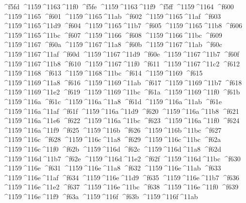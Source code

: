 \checkit ^^^^f5fd ^^^^1159^^^^1163^^^^11f0
\checkit ^^^^f5fe ^^^^1159^^^^1163^^^^11f9
\checkit ^^^^f5ff ^^^^1159^^^^1164
\checkit ^^^^f600 ^^^^1159^^^^1165
\checkit ^^^^f601 ^^^^1159^^^^1165^^^^11ab
\checkit ^^^^f602 ^^^^1159^^^^1165^^^^11af
\checkit ^^^^f603 ^^^^1159^^^^1165^^^^11d9
\checkit ^^^^f604 ^^^^1159^^^^1165^^^^11b7
\checkit ^^^^f605 ^^^^1159^^^^1165^^^^11b8
\checkit ^^^^f606 ^^^^1159^^^^1165^^^^11bc
\checkit ^^^^f607 ^^^^1159^^^^1166
\checkit ^^^^f608 ^^^^1159^^^^1166^^^^11bc
\checkit ^^^^f609 ^^^^1159^^^^1167
\checkit ^^^^f60a ^^^^1159^^^^1167^^^^11a8
\checkit ^^^^f60b ^^^^1159^^^^1167^^^^11ab
\checkit ^^^^f60c ^^^^1159^^^^1167^^^^11af
\checkit ^^^^f60d ^^^^1159^^^^1167^^^^11d9
\checkit ^^^^f60e ^^^^1159^^^^1167^^^^11b7
\checkit ^^^^f60f ^^^^1159^^^^1167^^^^11b8
\checkit ^^^^f610 ^^^^1159^^^^1167^^^^11f0
\checkit ^^^^f611 ^^^^1159^^^^1167^^^^11c2
\checkit ^^^^f612 ^^^^1159^^^^1168
\checkit ^^^^f613 ^^^^1159^^^^1168^^^^11bc
\checkit ^^^^f614 ^^^^1159^^^^1169
\checkit ^^^^f615 ^^^^1159^^^^1169^^^^11a8
\checkit ^^^^f616 ^^^^1159^^^^1169^^^^11ab
\checkit ^^^^f617 ^^^^1159^^^^1169^^^^11b7
\checkit ^^^^f618 ^^^^1159^^^^1169^^^^11e2
\checkit ^^^^f619 ^^^^1159^^^^1169^^^^11bc
\checkit ^^^^f61a ^^^^1159^^^^1169^^^^11f0
\checkit ^^^^f61b ^^^^1159^^^^116a
\checkit ^^^^f61c ^^^^1159^^^^116a^^^^11a8
\checkit ^^^^f61d ^^^^1159^^^^116a^^^^11ab
\checkit ^^^^f61e ^^^^1159^^^^116a^^^^11af
\checkit ^^^^f61f ^^^^1159^^^^116a^^^^11d9
\checkit ^^^^f620 ^^^^1159^^^^116a^^^^11b8
\checkit ^^^^f621 ^^^^1159^^^^116a^^^^11e6
\checkit ^^^^f622 ^^^^1159^^^^116a^^^^11bc
\checkit ^^^^f623 ^^^^1159^^^^116a^^^^11f0
\checkit ^^^^f624 ^^^^1159^^^^116a^^^^11f9
\checkit ^^^^f625 ^^^^1159^^^^116b
\checkit ^^^^f626 ^^^^1159^^^^116b^^^^11bc
\checkit ^^^^f627 ^^^^1159^^^^116c
\checkit ^^^^f628 ^^^^1159^^^^116c^^^^11a8
\checkit ^^^^f629 ^^^^1159^^^^116c^^^^11bc
\checkit ^^^^f62a ^^^^1159^^^^116c^^^^11f0
\checkit ^^^^f62b ^^^^1159^^^^116d
\checkit ^^^^f62c ^^^^1159^^^^116d^^^^11a8
\checkit ^^^^f62d ^^^^1159^^^^116d^^^^11b7
\checkit ^^^^f62e ^^^^1159^^^^116d^^^^11e2
\checkit ^^^^f62f ^^^^1159^^^^116d^^^^11bc
\checkit ^^^^f630 ^^^^1159^^^^116e
\checkit ^^^^f631 ^^^^1159^^^^116e^^^^11a8
\checkit ^^^^f632 ^^^^1159^^^^116e^^^^11ab
\checkit ^^^^f633 ^^^^1159^^^^116e^^^^11af
\checkit ^^^^f634 ^^^^1159^^^^116e^^^^11d9
\checkit ^^^^f635 ^^^^1159^^^^116e^^^^11b7
\checkit ^^^^f636 ^^^^1159^^^^116e^^^^11e2
\checkit ^^^^f637 ^^^^1159^^^^116e^^^^11bc
\checkit ^^^^f638 ^^^^1159^^^^116e^^^^11f0
\checkit ^^^^f639 ^^^^1159^^^^116e^^^^11f9
\checkit ^^^^f63a ^^^^1159^^^^116f
\checkit ^^^^f63b ^^^^1159^^^^116f^^^^11ab
